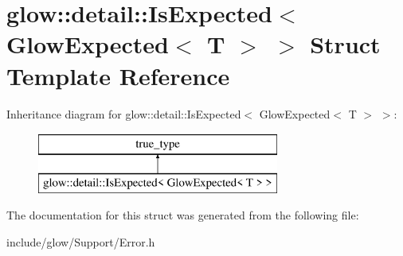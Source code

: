\hypertarget{structglow_1_1detail_1_1_is_expected_3_01_glow_expected_3_01_t_01_4_01_4}{}\section{glow\+:\+:detail\+:\+:Is\+Expected$<$ Glow\+Expected$<$ T $>$ $>$ Struct Template Reference}
\label{structglow_1_1detail_1_1_is_expected_3_01_glow_expected_3_01_t_01_4_01_4}
Inheritance diagram for glow\+:\+:detail\+:\+:Is\+Expected$<$ Glow\+Expected$<$ T $>$ $>$\+:\begin{figure}[H]
\begin{center}
\leavevmode
\includegraphics[height=2.000000cm]{structglow_1_1detail_1_1_is_expected_3_01_glow_expected_3_01_t_01_4_01_4}
\end{center}
\end{figure}


The documentation for this struct was generated from the following file\+:\begin{DoxyCompactItemize}
\item 
include/glow/\+Support/Error.\+h\end{DoxyCompactItemize}
